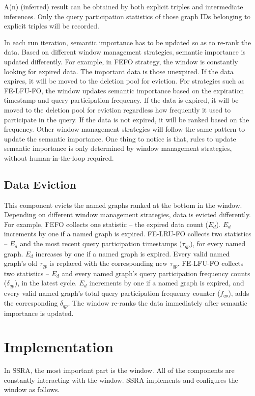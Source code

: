 A(n) (inferred) result can be obtained by both explicit triples and intermediate inferences. 
Only the query participation statistics of those graph IDs belonging to explicit triples will be recorded.

In each run iteration, semantic importance has to be updated so as to re-rank the data. 
Based on different window management strategies, semantic importance is updated differently.
For example, in FEFO strategy, the window is constantly looking for expired data.
The important data is those unexpired. 
If the data expires, it will be moved to the deletion pool for eviction. 
For strategies such as FE-LFU-FO, the window updates semantic importance based on the expiration timestamp and query participation frequency.
If the data is expired, it will be moved to the deletion pool for eviction regardless how frequently it used to participate in the query. 
If the data is not expired, it will be ranked based on the frequency.
Other window management strategies will follow the same pattern to update the semantic importance.
One thing to notice is that, rules to update semantic importance is only determined by window management strategies, without human-in-the-loop required.
%
\subsection{Data Eviction}
This component evicts the named graphs ranked at the bottom in the window. 
Depending on different window management strategies, data is evicted differently.
For example, FEFO collects one statistic -- the expired data count ($E_{d}$). 
$E_{d}$ increments by one if a named graph is expired.
FE-LRU-FO collects two statistics -- $E_{d}$ and the most recent query participation timestamps ($\tau_{qp}$), for every named graph. 
$E_{d}$ increases by one if a named graph is expired.
Every valid named graph's old $\tau_{qp}$ is replaced with the corresponding new $\tau_{qp}$.
FE-LFU-FO collects two statistics -- $E_{d}$ and every named graph's query participation frequency counts ($\delta_{qp}$), in the latest cycle.
$E_{d}$ increments by one if a named graph is expired, and every valid named graph's total query participation frequency counter ($f_{qp}$), adds the corresponding $\delta_{qp}$. 
The window re-ranks the data immediately after semantic importance is updated. 
%
\section{Implementation}
In SSRA, the most important part is the window. 
All of the components are constantly interacting with the window.
SSRA implements and configures the window as follows.

